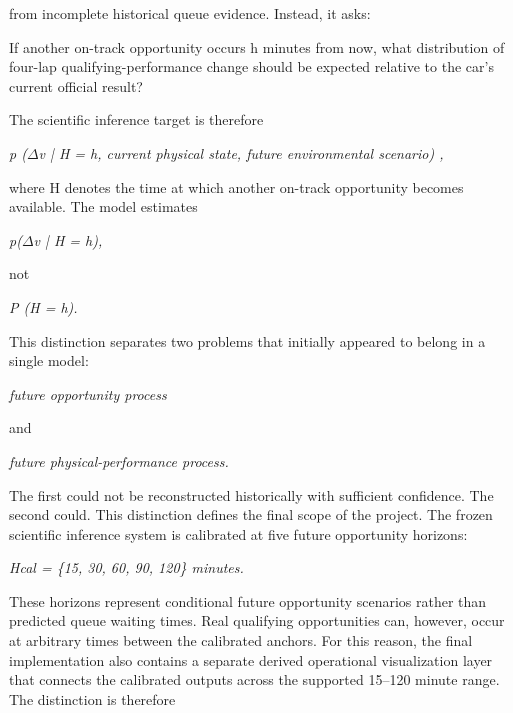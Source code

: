from incomplete historical queue evidence. Instead, it asks:

If another on-track opportunity occurs h minutes from now, what distribution of four-lap qualifying-performance change should be expected relative to the car's current official result?

The scientific inference target is therefore

\begin{center}\textit{p (\ensuremath{\Delta}v | H = h, current physical state, future environmental scenario) ,}\end{center}

where H denotes the time at which another on-track opportunity becomes available. The model estimates

\begin{center}\textit{p(\ensuremath{\Delta}v | H = h),}\end{center}

not

\begin{center}\textit{P (H = h).}\end{center}

This distinction separates two problems that initially appeared to belong in a single model:

\begin{center}\textit{future opportunity process}\end{center}

and

\begin{center}\textit{future physical-performance process.}\end{center}

The first could not be reconstructed historically with sufficient confidence. The second could. This distinction defines the final scope of the project. The frozen scientific inference system is calibrated at five future opportunity horizons:

\begin{center}\textit{Hcal = \{15, 30, 60, 90, 120\} minutes.}\end{center}

These horizons represent conditional future opportunity scenarios rather than predicted queue waiting times. Real qualifying opportunities can, however, occur at arbitrary times between the calibrated anchors. For this reason, the final implementation also contains a separate derived operational visualization layer that connects the calibrated outputs across the supported 15--120 minute range. The distinction is therefore

